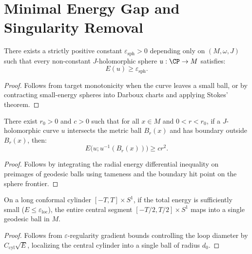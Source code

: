 \section{Minimal Energy Gap and Singularity Removal}

\begin{theorem}
\label{a07:sphere_energy_gap}
\leanok
{}
There exists a strictly positive constant $\varepsilon_{\mathrm{sph}} > 0$ depending only on $(M, \omega, J)$ such that every non-constant $J$-holomorphic sphere $u : \CP \to M$ satisfies:
\[
E(u) \ge \varepsilon_{\mathrm{sph}}.
\]
\end{theorem}
\begin{proof}
Follows from target monotonicity when the curve leaves a small ball, or by contracting small-energy spheres into Darboux charts and applying Stokes' theorem.
\end{proof}

\begin{lemma}
\label{a08:monotonicity}
\leanok
{}
There exist $r_0 > 0$ and $c > 0$ such that for all $x \in M$ and $0 < r < r_0$, if a $J$-holomorphic curve $u$ intersects the metric ball $B_r(x)$ and has boundary outside $B_r(x)$, then:
\[
E\big(u; u^{-1}(B_r(x))\big) \ge c r^2.
\]
\end{lemma}
\begin{proof}
Follows by integrating the radial energy differential inequality on preimages of geodesic balls using tameness and the boundary hit point on the sphere frontier.
\end{proof}

\begin{lemma}
\label{a09:cylinder_localization}
\leanok
{}
On a long conformal cylinder $[-T, T] \times S^1$, if the total energy is sufficiently small ($E \le \varepsilon_{\mathrm{loc}}$), the entire central segment $[-T/2, T/2] \times S^1$ maps into a single geodesic ball in $M$.
\end{lemma}
\begin{proof}
Follows from $\varepsilon$-regularity gradient bounds controlling the loop diameter by $C_{\mathrm{cyl}}\sqrt{E}$, localizing the central cylinder into a single ball of radius $d_0$.
\end{proof}

